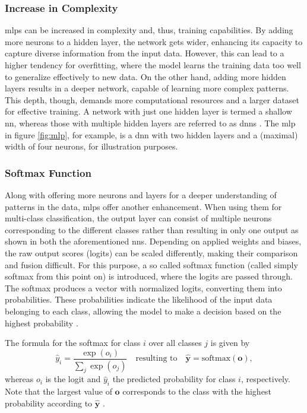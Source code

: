 \subsubsection*{Increase in Complexity}

\glspl{mlp} can be increased in complexity and, thus, training capabilities. By adding more neurons to a hidden layer, the network gets wider, enhancing its capacity to capture diverse information from the input data. However, this can lead to a higher tendency for overfitting, where the model learns the training data too well to generalize effectively to new data. On the other hand, adding more hidden layers results in a deeper network, capable of learning more complex patterns. This depth, though, demands more computational resources and a larger dataset for effective training. A network with just one hidden layer is termed a shallow \gls{nn}, whereas those with multiple hidden layers are referred to as \glspl{dnn} \autocite{Bernard2021,Nielsen2015,Zhang.Lipton.ea2023}. The \gls{mlp} in figure \ref{fig:mlp}, for example, is a \gls{dnn} with two hidden layers and a (maximal) width of four neurons, for illustration purposes.

\subsubsection*{Softmax Function}
\label{subsec:softmax}

Along with offering more neurons and layers for a deeper understanding of patterns in the data, \glspl{mlp} offer another enhancement. When using them for multi-class classification, the output layer can consist of multiple neurons corresponding to the different classes rather than resulting in only one output as shown in both the aforementioned \glspl{nn}. Depending on applied weights and biases, the raw output scores (logits) can be scaled differently, making their comparison and fusion difficult. For this purpose, a so called softmax function (called simply softmax from this point on) is introduced, where the logits are passed through. The softmax produces a vector with normalized logits, converting them into probabilities. These probabilities indicate the likelihood of the input data belonging to each class, allowing the model to make a decision based on the highest probability \autocite{Goodfellow.Bengio.ea2016,Szeliski2022}.

The formula for the softmax for class \( i \) over all classes \( j \) is given by
\begin{equation}
    \hat{y}_i = \frac{\exp(o_i)}{\sum_{j} \exp(o_j)} \quad\text{resulting to}\quad \mathbf{\hat{y}} = \text{softmax}(\mathbf{o}),
\end{equation}
whereas \( o_i \) is the logit and \( \hat{y}_i \) the predicted probability for class \( i \), respectively. Note that the largest value of \( \mathbf{o} \) corresponds to the class with the highest probability according to \( \mathbf{\hat{y}} \) \autocite{Goodfellow.Bengio.ea2016,Szeliski2022,Zhang.Lipton.ea2023}. 

